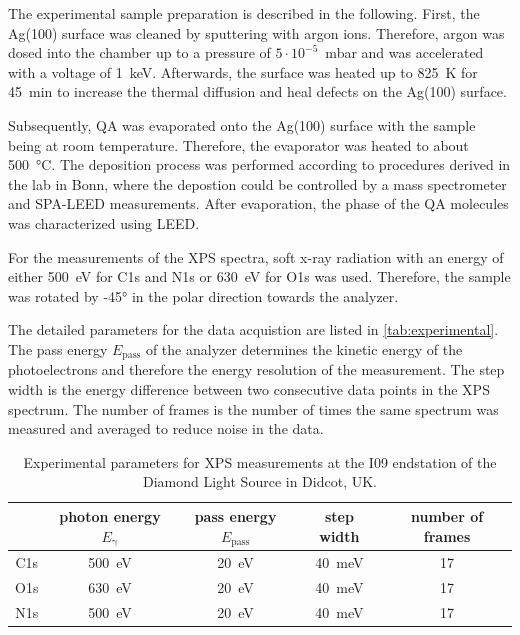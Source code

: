 The experimental sample preparation is described in the following. First, the Ag(100) surface was cleaned by sputtering with argon ions. Therefore, argon was dosed into the chamber up to a pressure of $5\cdot 10^{-5}$~\si{mbar} and was accelerated with a voltage of 1~\si{keV}. Afterwards, the surface was heated up to 825~\si{K} for 45~\si{min} to increase the thermal diffusion and heal defects on the Ag(100) surface.

Subsequently, \ac{QA} was evaporated onto the Ag(100) surface with the sample being at room temperature. Therefore, the evaporator was heated to about 500~\si{\degreeCelsius}. The deposition process was performed according to procedures derived in the lab in Bonn, where the depostion could be controlled by a mass spectrometer and \ac{SPA-LEED} measurements. After evaporation, the phase of the \ac{QA} molecules was characterized using \ac{LEED}.

For the measurements of the \ac{XPS} spectra, soft x-ray radiation with an energy of either 500~\si{\eV} for C1s and N1s or 630~\si{\eV} for O1s was used. Therefore, the sample was rotated by -45\si{\degree} in the polar direction towards the analyzer.

The detailed parameters for the data acquistion are listed in \autoref{tab:experimental}. The pass energy $E_\mathrm{pass}$ of the analyzer determines the kinetic energy of the photoelectrons and therefore the energy resolution of the measurement. The step width is the energy difference between two consecutive data points in the \ac{XPS} spectrum. The number of frames is the number of times the same spectrum was measured and averaged to reduce noise in the data.

\begin{table}[H]
	\centering
	\caption{Experimental parameters for \ac{XPS} measurements at the I09 endstation of the Diamond Light Source in Didcot, UK.}
	\begin{tabular}{|c|c|c|c|c|}
		\hline
		& photon energy $E_\mathrm{\gamma}$ & pass energy $E_\mathrm{pass}$ & step width & number of frames \\
		\hline
		C1s & 500~\si{\eV} & 20~\si{\eV} & 40~\si{meV} & 17 \\
		\hline
		O1s & 630~\si{\eV} & 20~\si{\eV} & 40~\si{meV} & 17 \\
		\hline
		N1s & 500~\si{\eV} & 20~\si{\eV} & 40~\si{meV} & 17 \\
		\hline
	\end{tabular}
	\label{tab:experimental}
\end{table}

